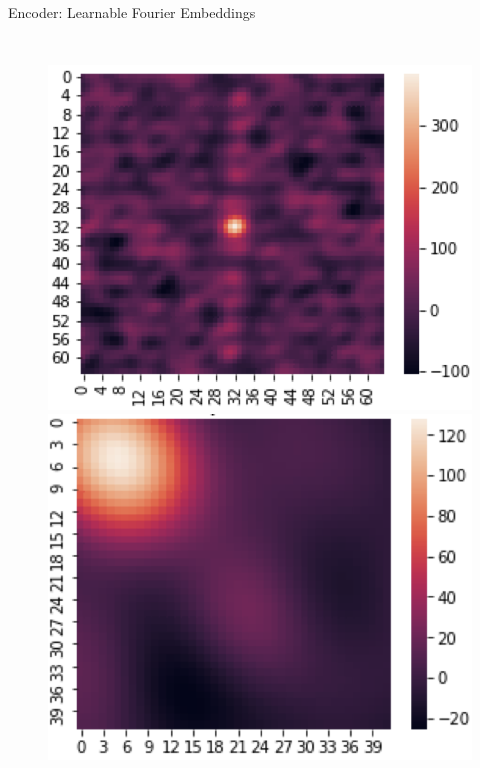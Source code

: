 \documentclass[10pt,aspectratio=169]{beamer}
\begin{document}
\begin{frame}{Encoder: Learnable Fourier Embeddings}
\begin{columns}[T]
      \begin{figure}
        \centering
        \includegraphics[width=\columnwidth,height=0.25\textheight,keepaspectratio]{docs/latex/figures/lff_high_freq.png}
        \includegraphics[width=\columnwidth,height=0.25\textheight,keepaspectratio]{docs/latex/figures/lff_low_freq_ball.png}

\end{figure}
\end{columns}
\end{frame}
\end{document}

